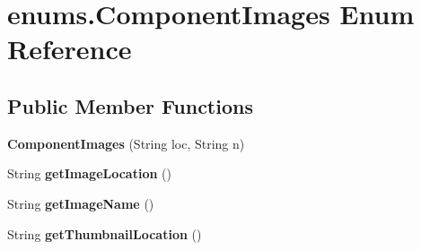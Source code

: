 \hypertarget{enumenums_1_1_component_images}{\section{enums.\-Component\-Images Enum Reference}
\label{enumenums_1_1_component_images}
}
\subsection*{Public Member Functions}
\begin{DoxyCompactItemize}
\item 
\hypertarget{enumenums_1_1_component_images_a53a96f92ff6cec0ab6b29cf28762966b}{{\bfseries Component\-Images} (String loc, String n)}\label{enumenums_1_1_component_images_a53a96f92ff6cec0ab6b29cf28762966b}

\item 
\hypertarget{enumenums_1_1_component_images_a877080377a404f28339c3a1ba83f0882}{String {\bfseries get\-Image\-Location} ()}\label{enumenums_1_1_component_images_a877080377a404f28339c3a1ba83f0882}

\item 
\hypertarget{enumenums_1_1_component_images_a6f740e33d38be06d2adce64b584b47c5}{String {\bfseries get\-Image\-Name} ()}\label{enumenums_1_1_component_images_a6f740e33d38be06d2adce64b584b47c5}

\item 
\hypertarget{enumenums_1_1_component_images_a57d4b1854ff60eb9b9bc9df25383840c}{String {\bfseries get\-Thumbnail\-Location} ()}\label{enumenums_1_1_component_images_a57d4b1854ff60eb9b9bc9df25383840c}

\end{DoxyCompactItemize}
